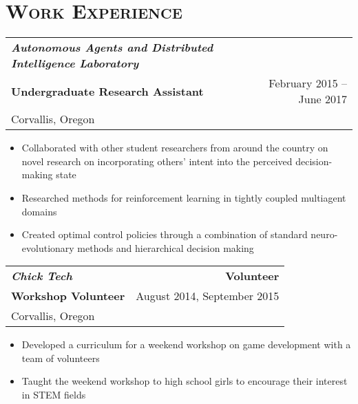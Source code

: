 \documentclass[letterpaper,10pt,titlepage]{article}
\begin{document}
\section*{\textsc{Work Experience}}
\begin{tabularx}{\linewidth}{Xr}
\textbf{\textit{Autonomous Agents and Distributed Intelligence Laboratory}} & \\
\textbf{Undergraduate Research Assistant}          & February 2015 -- June 2017\\
Corvallis, Oregon & \\
\end{tabularx}
\begin{itemize} \itemsep1pt \parskip0pt 
\item Collaborated with other student researchers from around the country on novel research on incorporating others' intent into the perceived decision-making state
\item Researched methods for reinforcement learning in tightly coupled multiagent domains
\item Created optimal control policies through a combination of standard neuro-evolutionary methods and hierarchical decision making
\end{itemize}


\begin{tabularx}{\linewidth}{Xr}
\textbf{\textit{Chick Tech}}   & \textbf{Volunteer}\\
\textbf{Workshop Volunteer}    & August 2014, September 2015\\
Corvallis, Oregon & \\
\end{tabularx}

\begin{itemize} \itemsep1pt \parskip0pt 
\item Developed a curriculum for a weekend workshop on game development with a team of volunteers
\item Taught the weekend workshop to high school girls to encourage their interest in STEM fields
\end{itemize}
\end{document}
